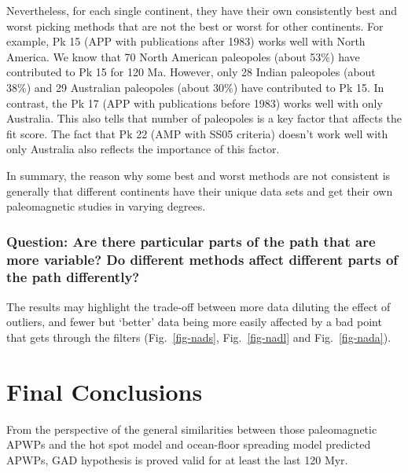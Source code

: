 Nevertheless, for each single continent, they have their own consistently best
and worst picking methods that are not the best or worst for other continents.
For example, Pk 15 (APP with publications after 1983) works well with North
America. We know that 70 North American paleopoles (about 53\%) have contributed
to Pk 15 for 120 Ma. However, only 28 Indian paleopoles (about 38\%)
and 29 Australian paleopoles (about 30\%) have contributed to Pk 15. In
contrast, the Pk 17 (APP with publications before 1983) works well with only
Australia. This also tells that number of paleopoles is a key factor that
affects the fit score. The fact that Pk 22 (AMP with SS05 criteria) doesn't work
well with only Australia also reflects the importance of this factor.

In summary, the reason why some best and worst methods are not consistent is
generally that different continents have their unique data sets and get their
own paleomagnetic studies in varying degrees.

\subsubsection{Question: Are there particular parts of the path that are more
variable? Do different methods affect different parts of the path differently?}

The results may highlight the trade-off between more data diluting the effect of
outliers, and fewer but `better' data being more easily affected by a bad point
that gets through the filters (Fig.~\ref{fig-nads}, Fig.~\ref{fig-nadl} and
Fig.~\ref{fig-nada}).



\section{Final Conclusions}

From the perspective of the general similarities between those paleomagnetic
APWPs and the hot spot model and ocean-floor spreading model predicted APWPs,
GAD hypothesis is proved valid for at least the last 120 Myr.

